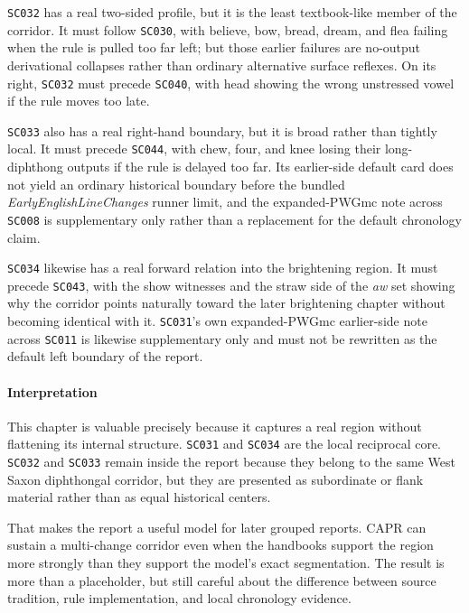 \documentclass[
  british,
  a4paper,
]{article}
\begin{document}
\texttt{SC032} has a real two-sided profile, but it is the least
textbook-like member of the corridor. It must follow \texttt{SC030},
with believe, bow, bread, dream, and flea failing when the rule is
pulled too far left; but those earlier failures are no-output
derivational collapses rather than ordinary alternative surface
reflexes. On its right, \texttt{SC032} must precede \texttt{SC040}, with
head showing the wrong unstressed vowel if the rule moves too late.

\texttt{SC033} also has a real right-hand boundary, but it is broad
rather than tightly local. It must precede \texttt{SC044}, with chew,
four, and knee losing their long-diphthong outputs if the rule is
delayed too far. Its earlier-side default card does not yield an
ordinary historical boundary before the bundled
\emph{EarlyEnglishLineChanges} runner limit, and the expanded-PWGmc note
across \texttt{SC008} is supplementary only rather than a replacement
for the default chronology claim.

\texttt{SC034} likewise has a real forward relation into the brightening
region. It must precede \texttt{SC043}, with the show witnesses and the
straw side of the \emph{aw} set showing why the corridor points
naturally toward the later brightening chapter without becoming
identical with it. \texttt{SC031}'s own expanded-PWGmc earlier-side note
across \texttt{SC011} is likewise supplementary only and must not be
rewritten as the default left boundary of the report.

\paragraph{Interpretation}\label{interpretation-22}

This chapter is valuable precisely because it captures a real region
without flattening its internal structure. \texttt{SC031} and
\texttt{SC034} are the local reciprocal core. \texttt{SC032} and
\texttt{SC033} remain inside the report because they belong to the same
West Saxon diphthongal corridor, but they are presented as subordinate
or flank material rather than as equal historical centers.

That makes the report a useful model for later grouped reports. CAPR can
sustain a multi-change corridor even when the handbooks support the
region more strongly than they support the model's exact segmentation.
The result is more than a placeholder, but still careful about the
difference between source tradition, rule implementation, and local
chronology evidence.
\end{document}
